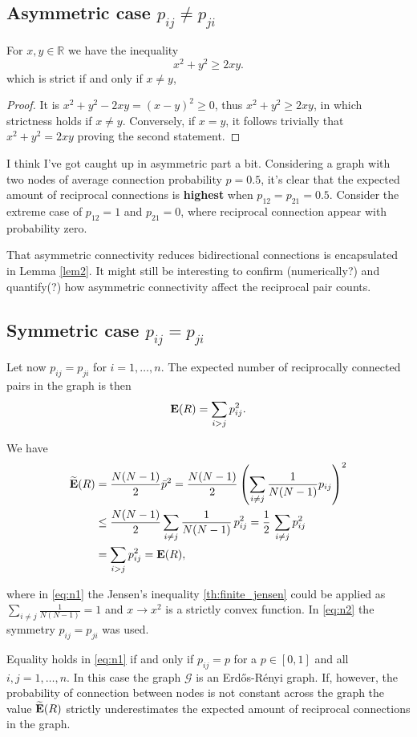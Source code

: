 \subsection{Asymmetric case $p_{ij} \neq  p _{ji}$}

\begin{lemma} \label{lem2}
  For $x,y \in \mathbb{R}$ we have the inequality
  \[
  x^2 + y^2 \geq 2xy.
  \]
  which is strict if and only if $x \neq y$,
  \end{lemma}

\begin{proof}
  It is $x^2 + y^2 - 2xy = (x - y)^2 \geq 0 $, thus $  x^2 + y^2 \geq 2xy$, in which strictness holds if $x \neq y$. Conversely, if $x=y$, it follows trivially that $x^2 + y^2 = 2xy$ proving the second statement.
\end{proof}

I think I've got caught up in asymmetric part a bit. Considering a graph with two nodes of average connection probability $p=0.5$, it's clear that the expected amount of reciprocal connections is \textbf{highest} when $p_{12} = p_{21} = 0.5$. Consider the extreme case of $p_{12} = 1$ and $p_{21} = 0$, where reciprocal connection appear with probability zero.

That asymmetric connectivity reduces bidirectional connections is encapsulated in Lemma \ref{lem2}. It might still be interesting to confirm (numerically?) and quantify(?) how asymmetric connectivity affect the reciprocal pair counts.

\subsection{Symmetric case  $p_{ij} =  p _{ji}$}

Let now $p_{ij} =  p _{ji}$ for $i=1,\dots,n$. The expected number of reciprocally connected pairs in the graph is then
\[
\operatorname{\mathbf{E}}(R) = \sum_{i>j} p_{ij}^2.
\]

We have
\begin{align}
  \widetilde{\operatorname{\mathbf{E}}}(R) &= \frac{N(N-1)}{2} \bar{p}^2 = \frac{N(N-1)}{2} \left(\sum_{i \neq j} \frac{1}{N(N-1)} p_{ij}\right)^2 \nonumber\\
  & \leq \frac{N(N-1)}{2} \sum_{i \neq j}\frac {1}{N(N-1)}\, p_{ij}^2 = \frac{1}{2}\, \sum_{i \neq j} p_{ij}^2 \label{eq:n1} \\
  & = \sum_{i>j} p_{ij}^2 = \operatorname{\mathbf{E}}(R), \label{eq:n2} 
\end{align}

where in \ref{eq:n1} the Jensen's inequality \ref{th:finite_jensen} could be applied as $\sum_{i \neq j} \frac{1}{N(N-1)}=1$ and $x \to x^2$ is a strictly convex function. In \ref{eq:n2} the symmetry $p_{ij} =  p _{ji}$ was used.

Equality holds in \ref{eq:n1} if and only if $p_{ij} = p$ for a $p \in [0,1]$ and all $i,j=1,\dots,n$. In this case the graph $\mathcal{G}$ is an Erd\H{o}s-R\'{e}nyi graph. If, however, the probability of connection between nodes is not constant across the graph the value $\widetilde{\operatorname{\mathbf{E}}}(R)$ strictly underestimates the expected amount of reciprocal connections in the graph.
